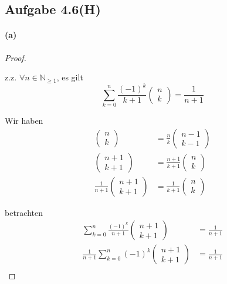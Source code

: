 \newpage

\subsection{Aufgabe 4.6(H)}

\paragraph{(a)}
\begin{proof}
$ $\newline

z.z. $\forall n\in\mathbb{N}_{\geq1}$, es gilt
\begin{equation*}
\sum_{k=0}^{n}\frac{(-1)^k}{k+1}
\begin{pmatrix}
n \\
k
\end{pmatrix}
=
\frac{1}{n+1}
\end{equation*}

Wir haben
\begin{align*}
\begin{pmatrix}
n \\
k
\end{pmatrix}
&=
\frac{n}{k}
\begin{pmatrix}
n-1 \\
k-1
\end{pmatrix}\\
\begin{pmatrix}
n+1 \\
k+1
\end{pmatrix}
&=
\frac{n+1}{k+1}
\begin{pmatrix}
n \\
k
\end{pmatrix}\\
\frac{1}{n+1}
\begin{pmatrix}
n+1 \\
k+1
\end{pmatrix}
&=
\frac{1}{k+1}
\begin{pmatrix}
n \\
k
\end{pmatrix}
\end{align*}

betrachten
\begin{align*}
\sum_{k=0}^{n}\frac{(-1)^k}{n+1}
\begin{pmatrix}
n+1 \\
k+1
\end{pmatrix}
&=
\frac{1}{n+1}\\
\frac{1}{n+1}
\sum_{k=0}^{n}(-1)^k
\begin{pmatrix}
n+1 \\
k+1
\end{pmatrix}
&=
\frac{1}{n+1}\\
\end{align*}


\end{proof}
